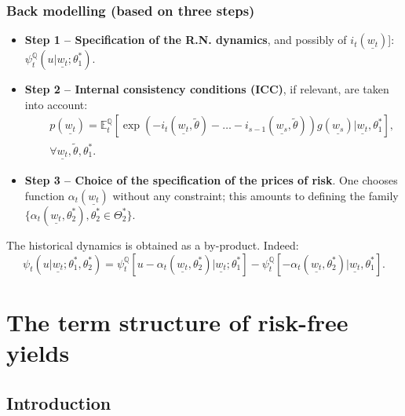 \documentclass[
  12pt,
]{book}
\providecommand{\tightlist}{%
  \setlength{\itemsep}{0pt}\setlength{\parskip}{0pt}}
\theoremstyle{definition}
\theoremstyle{definition}
\theoremstyle{definition}
\theoremstyle{definition}
\theoremstyle{remark}
\begin{document}
\hypertarget{back-modelling-based-on-three-steps}{%
\subsection{Back modelling (based on three steps)}\label{back-modelling-based-on-three-steps}}

\begin{itemize}
\tightlist
\item
  \textbf{Step 1 -- Specification of the R.N. dynamics}, and possibly of \(i_{t}(\underline{w_t})\){]}: \(\psi^{\mathbb{Q}}_t (u | \underline{w_t}; \theta^*_1)\).
\item
  \textbf{Step 2 -- Internal consistency conditions (ICC)}, if relevant, are taken into account:
  \begin{equation*}
  \begin{array}{lll}
  && p(\underline{w_t}) = \mathbb{E}^{\mathbb{Q}}_t \left[ \exp (-i_{t} (\underline{w_t},\tilde{\theta}) - \dots - i_{s-1} (\underline{w_s}, \tilde{\theta}))g(\underline{w_s}) | \underline{w_t} , \theta^*_1\right] ,\\
  && \forall    \underline{w_t} , \tilde{\theta} , \theta^*_1.
  \end{array}
  \end{equation*}
\item
  \textbf{Step 3 -- Choice of the specification of the prices of risk}. One chooses function \(\alpha_t(\underline{w_t})\) without any constraint; this amounts to defining the family \(\{ \alpha_t (\underline{w_t}, \theta^*_2), \theta^*_2\in \Theta^*_2 \}\).
\end{itemize}

The historical dynamics is obtained as a by-product. Indeed:
\begin{equation*}
\psi_t(u | \underline{w_t} ; \theta^*_1, \theta^*_2) = \psi_t^{\mathbb{Q}}\left[ u -\alpha_t (\underline{w_t}, \theta^*_2)|\underline{w_t} ; \theta^*_1 \right] -\psi^{\mathbb{Q}}_t \left[- \alpha_t (\underline{w_t}, \theta^*_2) | \underline{w_t},\theta^*_1 \right].
\end{equation*}

\hypertarget{TSModels}{%
\chapter{The term structure of risk-free yields}\label{TSModels}}

\hypertarget{RFIntroduction}{%
\section{Introduction}\label{RFIntroduction}}
\end{document}
